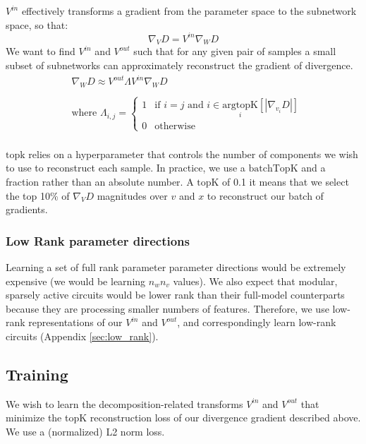 \documentclass{article}
\theoremstyle{plain}
\theoremstyle{definition}
\theoremstyle{remark}
\begin{document}
$V^{in}$ effectively transforms a gradient from the parameter space to the subnetwork space, so that: 
\begin{equation}
    \nabla_V D = V^{in} \nabla_W D
\end{equation}
We want to find $V^{in}$ and $V^{out}$ such that for any given pair of samples a small subset of subnetworks can approximately reconstruct the gradient of divergence. 
\begin{align}
    & \nabla_W D \approx V^{out} \Lambda V^{in} \nabla_W D \\\\
    & \text{where }  
    \Lambda_{i,j} = 
    \begin{cases} 
        1 & \text{if } i = j \text{ and } i \in \underset{i}{\text{argtopK}} \left[ \left| \nabla_{v_i} D \right| \right] \\ 
        0 & \text{otherwise}
    \end{cases} \\
\end{align}

$\text{topk}$ relies on a hyperparameter that controls the number of components we wish to use to reconstruct each sample. In practice, we use a $\text{batchTopK}$ \cite{bussmann2024batchtopk} and a fraction rather than an absolute number. A $\text{topK}$ of 0.1 it means that we select the top 10\% of $\nabla_V D$ magnitudes over $v$ and $x$ to reconstruct our batch of gradients.

\subsubsection{Low Rank parameter directions}
Learning a set of full rank parameter parameter directions would be extremely expensive (we would be learning $n_w n_v$ values). We also expect that modular, sparsely active circuits would be lower rank than their full-model counterparts because they are processing smaller numbers of features. Therefore, we use low-rank representations of our $V^{in}$ and $V^{out}$, and correspondingly learn low-rank circuits (Appendix \ref{sec:low_rank}). 

\subsection{Training}\label{subsec:training}
We wish to learn the decomposition-related transforms $V^{in}$ and $V^{out}$ that minimize the topK reconstruction loss of our divergence gradient described above. We use a (normalized) L2 norm loss.
\end{document}
